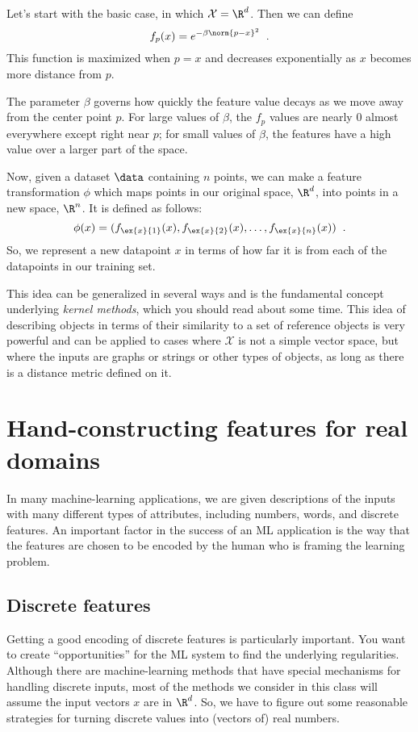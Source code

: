 Let's start with the basic case, in which $\mathcal{X} = \R^d$.  Then
we can define
\[f_p(x) = e^{-\beta\norm{p - x}^2}\;\;.\]
This function is maximized when $p = x$ and decreases exponentially as
$x$ becomes more distance from $p$.

The parameter $\beta$ governs how
quickly the feature value decays as we move away from the center point
$p$.  For large values of $\beta$, the $f_p$ values are nearly 0
almost everywhere except right near $p$;  for small values of $\beta$,
the features have a high value over a larger part of the space.


Now, given a dataset $\data$ containing $n$ points, we can make a
feature transformation $\phi$ which maps points in our original
space, $\R^d$, into points in a new space, $\R^n$.  It is defined as
follows:
\[\phi(x) = (f_{\ex{x}{1}}(x), f_{\ex{x}{2}}(x), \ldots,
  f_{\ex{x}{n}}(x))\;\;.\]
So, we represent a new datapoint $x$ in terms of how far it is from
each of the datapoints in our training set.

This idea can be generalized in several ways and is the fundamental
concept underlying {\em kernel methods}, which you should read about
some time.   This idea of describing objects in terms of their
similarity to a set of reference objects is very powerful and can be
applied to cases where $\mathcal{X}$ is not a simple vector space, but
where the inputs are graphs or strings or other types of objects, as
long as there is a distance metric defined on it.

  
\section{Hand-constructing features for real domains}

\label{handBuiltFeatures}
In many machine-learning applications, we are given descriptions of
the inputs with many different types of attributes, including numbers,
words, and discrete features.  An important factor in the success of
an ML application is the way that the features are chosen to be encoded
by the human who is framing the learning problem.  

\subsection{Discrete features}
Getting a good encoding of discrete features is particularly
important.  You want to create ``opportunities'' for the ML system to
find the underlying regularities.  Although there are machine-learning
methods that have special mechanisms for handling discrete inputs,
most of
the methods we consider in this class will assume the input vectors
$x$ are in $\R^d$.  So, we have to figure out some reasonable
strategies for turning discrete values into (vectors of) real numbers.

